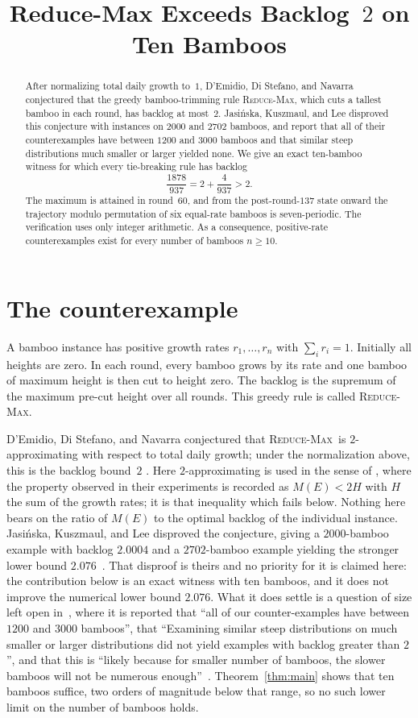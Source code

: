 \documentclass[11pt]{amsart}
\title{Reduce-Max Exceeds Backlog~$2$ on Ten Bamboos}
\date{}
\theoremstyle{remark}
\newcommand{\RM}{\textnormal{\textsc{Reduce-Max}}}
\begin{document}
\begin{abstract}
After normalizing total daily growth to~$1$, D'Emidio, Di Stefano,
and Navarra conjectured that the greedy bamboo-trimming rule \RM,
which cuts a tallest bamboo in each round, has backlog at most~$2$.
Jasi\'nska, Kuszmaul, and Lee disproved this conjecture with instances
on $2000$ and $2702$ bamboos, and report that all of their
counterexamples have between $1200$ and $3000$ bamboos and that
similar steep distributions much smaller or larger yielded none.
We give an exact ten-bamboo
witness for which every tie-breaking rule has backlog
\[
\frac{1878}{937}=2+\frac{4}{937}>2.
\]
The maximum is attained in round~$60$, and from the post-round-$137$
state onward the trajectory modulo permutation of six equal-rate
bamboos is seven-periodic. The verification uses only integer
arithmetic. As a consequence, positive-rate counterexamples exist for
every number of bamboos $n\ge 10$.
\end{abstract}

\maketitle

\section{The counterexample}

A bamboo instance has positive growth rates $r_1,\dots,r_n$ with
$\sum_i r_i=1$. Initially all heights are zero. In each round, every
bamboo grows by its rate and one bamboo of maximum height is then cut
to height zero. The backlog is the supremum of the maximum pre-cut
height over all rounds. This greedy rule is called \RM.

D'Emidio, Di Stefano, and Navarra conjectured that \RM\ is
$2$-approximating with respect to total daily growth; under the
normalization above, this is the backlog bound~$2$
\cite[Conjecture~1]{DDN19}. Here $2$-approximating is used in the
sense of \cite{DDN19}, where the property observed in their
experiments is recorded as $M(E)<2H$ with $H$ the sum of the growth
rates; it is that inequality which fails below. Nothing here bears on
the ratio of $M(E)$ to the optimal backlog of the individual instance.
Jasi\'nska, Kuszmaul, and Lee disproved
the conjecture, giving a $2000$-bamboo example with backlog $2.0004$
and a $2702$-bamboo example yielding the stronger lower bound
$2.076$~\cite[Section~4]{JKL26}. That disproof is theirs and no
priority for it is claimed here: the contribution below is an exact
witness with ten bamboos, and it does not improve the numerical lower
bound $2.076$. What it does settle is a question of size left open
in~\cite{JKL26}, where it is reported that ``all of our
counter-examples have between $1200$ and $3000$ bamboos'', that
``Examining similar steep distributions on much smaller or larger
distributions did not yield examples with backlog greater than $2$'',
and that this is ``likely because for smaller number of bamboos, the
slower bamboos will not be numerous enough''~\cite[Section~4.1]{JKL26}.
Theorem~\ref{thm:main} shows that ten bamboos suffice, two orders of
magnitude below that range, so no such lower limit on the number of
bamboos holds.
\end{document}
